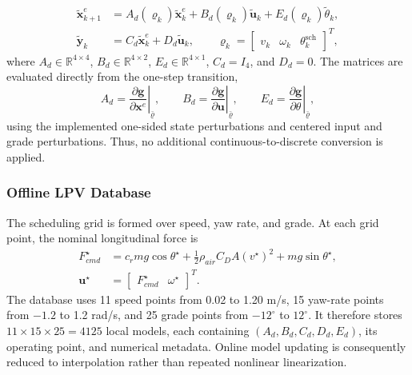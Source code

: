 \documentclass{ieeeaccess}
\begin{document}
\begin{align}
\widetilde{\bm{x}}^{e}_{k+1}
&=A_d(\boldsymbol\varrho_k)\widetilde{\bm{x}}^{e}_k
+B_d(\boldsymbol\varrho_k)\widetilde{\bm{u}}_k
+E_d(\boldsymbol\varrho_k)\widetilde\theta_k,\nonumber\\
\widetilde{\bm y}_k&=C_d\widetilde{\bm x}^e_k+D_d\widetilde{\bm u}_k,
\qquad
\boldsymbol\varrho_k=
\begin{bmatrix}v_k&\omega_k&\theta^{\mathrm{sch}}_k\end{bmatrix}^{T},
\label{eq:lpv_state}
\end{align}
where $A_d\in\mathbb R^{4\times4}$, $B_d\in\mathbb R^{4\times2}$, $E_d\in\mathbb R^{4\times1}$, $C_d=I_4$, and $D_d=0$. The matrices are evaluated directly from the one-step transition,
\begin{equation}
A_d=\left.\frac{\partial\bm g}{\partial\bm x^e}\right|_{\bar{\boldsymbol\varrho}},
\qquad
B_d=\left.\frac{\partial\bm g}{\partial\bm u}\right|_{\bar{\boldsymbol\varrho}},
\qquad
E_d=\left.\frac{\partial\bm g}{\partial\theta}\right|_{\bar{\boldsymbol\varrho}},
\label{eq:discrete_transition_jacobians}
\end{equation}
using the implemented one-sided state perturbations and centered input and grade perturbations. Thus, no additional continuous-to-discrete conversion is applied.

\subsubsection{Offline LPV Database}

The scheduling grid is formed over speed, yaw rate, and grade. At each grid point, the nominal longitudinal force is
\begin{equation}
\begin{aligned}
F_{cmd}^{\star}
&=c_rmg\cos\theta^{\star}
+\frac{1}{2}\rho_{air}C_DA(v^{\star})^2
+mg\sin\theta^{\star},\\
\bm u^{\star}
&=\begin{bmatrix}F_{cmd}^{\star}&\omega^{\star}\end{bmatrix}^{T}.
\end{aligned}
\label{eq:workpoint_force}
\end{equation}
The database uses 11 speed points from 0.02 to 1.20 m/s, 15 yaw-rate points from $-1.2$ to 1.2 rad/s, and 25 grade points from $-12^{\circ}$ to $12^{\circ}$. It therefore stores $11\times15\times25=4125$ local models, each containing $(A_d,B_d,C_d,D_d,E_d)$, its operating point, and numerical metadata. Online model updating is consequently reduced to interpolation rather than repeated nonlinear linearization.
\end{document}
